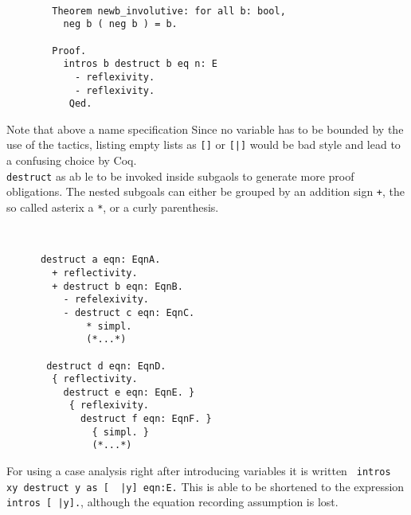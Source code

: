 	\begin{example} ~\\\vspace{-10mm}
	  \begin{lstlisting}
	  	Theorem newb_involutive: for all b: bool,
	  	  neg b ( neg b ) = b.
	  	  
	  	Proof. 
	  	  intros b destruct b eq n: E
	  	    - reflexivity. 
	  	    - reflexivity. 
	  	   Qed.  
	  \end{lstlisting}
	\end{example}	 
	 Note that above a name specification %
	 Since no variable has to be bounded by the use of the tactics, listing empty lists as \lstinline![]! or \lstinline![|]! would be bad style and lead to a confusing choice by Coq.\\	 
	 \lstinline!destruct! as ab le to be invoked inside subgaols to generate more proof obligations.
	  The nested subgoals can either be grouped by an addition sign \lstinline!+!, the so called asterix a \lstinline!*!, or a curly parenthesis.
	  \begin{example} ~\\\vspace{-10mm}
	  \begin{lstlisting}
	  destruct a eqn: EqnA.
	    + reflectivity.
	    + destruct b eqn: EqnB.
	      - refelexivity.
	      - destruct c eqn: EqnC.
	          * simpl. 
	          (*...*)       
	  
	   destruct d eqn: EqnD.
	    { reflectivity.
	      destruct e eqn: EqnE. } 
	       { reflexivity.
	         destruct f eqn: EqnF. } 
	           { simpl. }
	           (*...*)   
	   \end{lstlisting}
	   \end{example}	 
	  For using a case analysis right after introducing variables it is written
	  \lstinline! intros xy destruct y as [  |y] eqn:E.!	
	  This is able to be shortened to the expression \lstinline! intros [ |y].!, although the equation recording assumption is lost.   
    
   
   
   